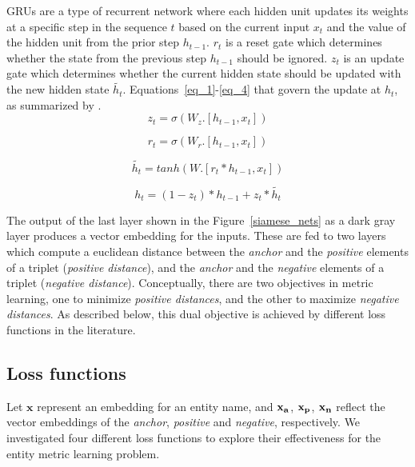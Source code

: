 GRUs are a type of recurrent network \cite{cho-al-emnlp14} where each hidden unit updates its weights at a specific step in the sequence $t$ based on the current input $x_t$ and the value of the hidden unit from the prior step $h_{t-1}$.  $r_t$ is a reset gate which determines whether the state from the previous step $h_{t-1}$ should be ignored. $z_t$ is an update gate which determines whether the current hidden state should be updated with the new hidden state $\tilde{h_t}$.  Equations~\ref{eq_1}-\ref{eq_4} that govern the update at $h_t$, as summarized by \cite{colah}.
\begin{equation}
z_t = \sigma(W_z . [h_{t-1}, x_t])
\label{eq_1}
\end{equation}

\begin{equation}
r_t = \sigma(W_r . [h_{t-1}, x_t])
\label{eq_2}
\end{equation}

\begin{equation}
\tilde{h_t} = tanh (W . [r_t * h_{t-1}, x_t])
\label{eq_3}
\end{equation}

\begin{equation}
h_t = (1- z_t) * h_{t-1} + z_t * \tilde{h_t}
\label{eq_4}
\end{equation}

The output of the last layer shown in the Figure~\ref{siamese_nets} as a dark gray layer produces a vector embedding for the inputs.  These are fed to two layers which compute a euclidean distance between the \textit{anchor} and the \textit{positive} elements of a triplet (\textit{positive distance}), and the \textit{anchor} and the \textit{negative} elements of a triplet (\textit{negative distance}).  Conceptually, there are two objectives in metric learning, one to minimize \textit{positive distances}, and the other to maximize \textit{negative distances}.  As described below, this dual objective is achieved by different loss functions in the literature.

\subsection{Loss functions}
\label{loss_functions}
Let $\mathbf{x}$ represent an embedding for an entity name, and $\bf{x_{a}}$, $\bf{x_{p}}$, $\bf{x_{n}}$ reflect the vector embeddings of the \textit{anchor}, \textit{positive} and \textit{negative}, respectively.  We investigated four different loss functions to explore their effectiveness for the entity metric learning problem.
